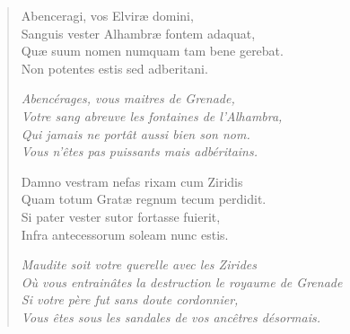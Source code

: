 \setlength\LTleft{-1.7cm}%
\begin{verse}%
  \quatrain%
  Abenceragi, vos Elviræ domini,           \\  %
  Sanguis vester Alhambræ fontem adaquat,  \\  %
  Quæ suum nomen numquam tam bene gerebat. \\  %
  Non potentes estis sed adberitani.     

  \emph{Abencérages, vous maitres de Grenade,}\\  %
  \emph{Votre sang abreuve les fontaines de l’Alhambra,}\\  %
  \emph{Qui jamais ne portât aussi bien son nom.}\\  %
  \emph{Vous n’êtes pas puissants mais adbéritains.}

  Damno vestram nefas rixam cum Ziridis   \\  %
  Quam totum Gratæ regnum tecum perdidit. \\  %
  Si pater vester sutor fortasse fuierit, \\  %
  	Infra antecessorum soleam nunc estis.

  \emph{Maudite soit votre querelle avec les Zirides}\\  %
  \emph{Où vous entrainâtes la destruction le royaume de Grenade}\\  %
  \emph{Si votre père fut sans doute cordonnier,}\\  %
  \emph{Vous êtes sous les sandales de vos ancêtres désormais.}
\end{verse}

